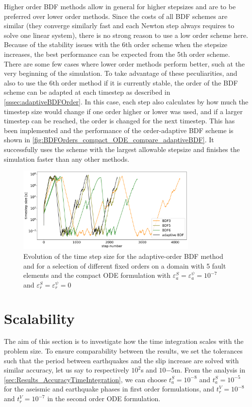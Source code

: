 Higher order BDF methods allow in general for higher stepsizes and are to be preferred over lower order methods. Since the costs of all BDF schemes are similar (they converge similarly fast and each Newton step always requires to solve one linear system), there is no strong reason to use a low order scheme here. Because of the stability issues with the 6th order scheme when the stepsize increases, the best performance can be expected from the 5th order scheme. There are some few cases where lower order methods perform better, such at the very beginning of the simulation. To take advantage of these peculiarities, and also to use the 6th order method if it is currently stable, the order of the BDF scheme can be adapted at each timestep as described in \autoref{sssec:adaptiveBDFOrder}. In this case, each step also calculates by how much the timestep size would change if one order higher or lower was used, and if a larger timestep can be reached, the order is changed for the next timestep. This has been implemented and the performance of the order-adaptive BDF scheme is shown in \autoref{fig:BDFOrders_compact_ODE_compare_adaptiveBDF}. It successfully uses the scheme with the largest allowable stepsize and finishes the simulation faster than any other methods. 


\begin{figure}[H]
	\centering
	\includegraphics[width=0.8\textwidth]{images/TANDEMTimeAnalysisDifferentBDFOrders_Lagrange_CompactODE_Size5_FULLTIME.png}
	\caption{Evolution of the time step size for the adaptive-order BDF method and for a selection of different fixed orders on a domain with 5 fault elements and the compact ODE formulation with $\varepsilon^S_a = \varepsilon^{\psi}_a = 10^{-7}$ and $\varepsilon^S_r = \varepsilon^{\psi}_r = 0$ }
	\label{fig:BDFOrders_compact_ODE_compare_adaptiveBDF}
\end{figure}


\section{Scalability}
The aim of this section is to investigate how the time integration scales with the problem size. To ensure comparability between the results, we set the tolerances such that the period between earthquakes and the slip increase are solved with similar accuracy, let us say to respectively $10^2$s and $10{-5}$m. From the analysis in \autoref{sec:Results_AccuracyTimeIntegration}, we can choose $t_a^S=10^{-8}$ and $t_a^S=10^{-5}$ for the aseismic and earthquake phases in first order formulations, and $t_r^V=10^{-8}$ and $t_r^V=10^{-7}$ in the second order ODE formulation. 

